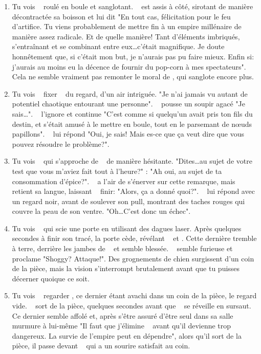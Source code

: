 {\begin{enumerate}
		\item Tu vois \nmPlayerXI ~ roulé en boule et sanglotant. \nmPlayerIV ~ est assis à côté, sirotant de manière décontractée sa boisson et lui dit "En tout cas, félicitation pour le feu d'artifice. Tu viens probablement de mettre fin à un empire millénaire de manière assez radicale. Et de quelle manière! Tant d'éléments imbriqués, s'entraînant et se combinant entre eux\dots c'était magnifique. Je doute honnêtement que, si c'était mon but, je n'aurais pas pu faire mieux. Enfin si: j'aurais au moins eu la décence de fournir du pop-corn à mes spectateurs". Cela ne semble vraiment pas remonter le moral de \nmPlayerXI, qui sanglote encore plus.
		
		\item Tu vois \nmPlayerIX ~ fixer \nmPlayerXI ~ du regard, d'un air intriguée. "Je n'ai jamais vu autant de potentiel chaotique entourant une personne". \nmPlayerXI ~ pousse un soupir agacé "Je sais\dots". \nmPlayerIX ~ l'ignore et continue "C'est comme si quelqu'un avait pris ton fils du destin, et s'était amusé à le mettre en boule, tout en le parsemant de nœuds papillons". \nmPlayerXI ~ lui répond "Oui, je sais! Mais es-ce que ça veut dire que vous pouvez résoudre le problème?".
		
		\item Tu vois \nmPlayerIII ~ qui s'approche de \nmPlayerXII ~ de manière hésitante. "Dites\dots au sujet de votre test que vous m'aviez fait tout à l'heure?" \nmPlayerXII: "Ah oui, au sujet de ta consommation d'épice?". \nmPlayerIII ~ a l'air de s'énerver sur cette remarque, mais retient sa langue, laissant \nmPlayerXII ~ finir: "Alors, ça a donné quoi?". \nmPlayerIII ~ lui répond avec un regard noir, avant de soulever son pull, montrant des taches rouges qui couvre la peau de son ventre. "Oh\dots C'est donc un échec".
		
		
		\item Tu vois \nmPlayerX ~ qui scie une porte en utilisant des dagues laser. Après quelques secondes à finir son tracé, la porte cède, révélant \nmPlayerVI ~ et \nmPlayerIX. Cette dernière tremble à terre, derrière les jambes de \nmPlayerVI ~ et semble blessée. \nmPlayerVI ~ semble furieuse et proclame "Shoggy? Attaque!". Des grognements de chien surgissent d'un coin de la pièce, mais la vision s'interrompt brutalement avant que tu puisses décerner quoique ce soit.
		
		\item Tu vois \nmPlayerIX ~ regarder \nmPlayerVIII, ce dernier étant avachi dans un coin de la pièce, le regard vide. \nmPlayerIX ~ sort de la pièce, quelques secondes avant que \nmPlayerVIII ~ se réveille en sursaut. Ce dernier semble affolé et, après s'être assuré d'être seul dans sa salle murmure à lui-même "Il faut que j'élimine \nmPlayerX ~ avant qu'il devienne trop dangereux. La survie de l'empire peut en dépendre", alors qu'il sort de la pièce, il passe devant \nmPlayerIX ~ qui a un sourire satisfait au coin.
		

\end{enumerate}}
